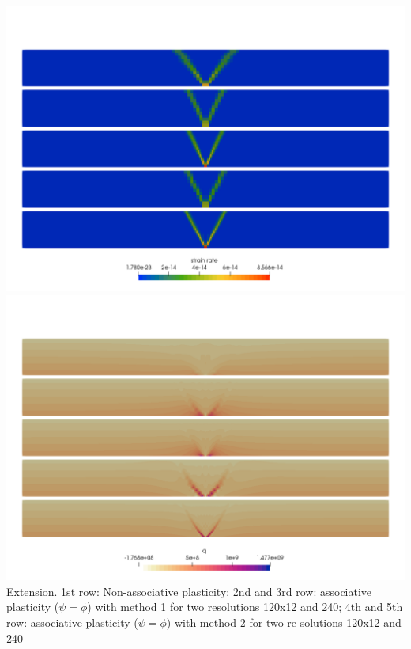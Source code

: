 \begin{center}
\includegraphics[width=.8\linewidth]{python_codes/fieldstone_39/images/extension_sr}\\
\includegraphics[width=.8\linewidth]{python_codes/fieldstone_39/images/extension_press}\\
{\small Extension. 1st row: Non-associative plasticity; 2nd and 3rd row: associative plasticity ($\psi=\phi$) with method 1 for two resolutions 120x12 and 240; 4th and 5th row: associative plasticity ($\psi=\phi$) with method 2 for two re    solutions 120x12 and 240}
\end{center}

